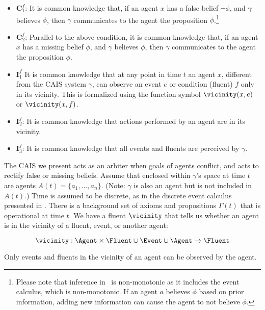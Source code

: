    \begin{itemize}
    \item $\mathbf{C}^f_1$: It is common knowledge that, if an agent
      $x$ has a false belief $\lnot \phi$, and $\gamma$
      believes $\phi$, then $\gamma$ communicates to the agent the
      proposition $\phi$.\footnote{Please note that inference in
        \DCEC\ is non-monotonic as it includes the event calculus,
        which is non-monotonic.  If an agent $a$ believes $\phi$ based
        on prior information, adding new information can cause the
        agent to not believe $\phi$.}

    \item $\mathbf{C}^f_2$: Parallel to the above condition, it is
      common knowledge that, if an agent $x$ has a missing belief
      $\phi$, and $\gamma$ believes $\phi$, then $\gamma$ communicates to
      the agent the proposition $\phi$.

    \item$\mathbf{I}^f_1$ It is common knowledge that at any point in
      time $t$ an agent $x$, different from the CAIS system $\gamma$,
      can observe an event $e$ or condition (fluent) $f$ only in its
      vicinity. This is formalized using the function symbol
      $\vicinity(x, e)$ or $\vicinity(x, f)$.

      \item $\mathbf{I}^f_2$: It is common knowledge that actions
        performed by an agent are in its vicinity.

      \item $\mathbf{I}^f_3$: It is common knowledge that all events
        and fluents are perceived by $\gamma$.
     \end{itemize}

The CAIS we present acts as an arbiter when goals of agents conflict,
and acts to rectify false or missing beliefs.  Assume that enclosed
within $\gamma$'s space at time $t$ are agents
$A(t) = \{a_1, \ldots, a_n\}$.  (Note: $\gamma$ is also an agent but
is not included in $A(t)$.)  Time is assumed to be discrete, as in the
discrete event calculus presented in \cite{mueller_commonsense_2014}.  There is a
background set of axioms and propositions $\Gamma(t)$ that is
operational at time $t$.  We have a fluent $\vicinity$ that tells us
whether an agent is in the vicinity of a fluent, event, or another
agent:
\begin{footnotesize}
$$\vicinity: \Agent \times \Fluent \cup \Event \cup \Agent \rightarrow
\Fluent $$
\end{footnotesize}
 Only events and fluents in the vicinity of an agent can be
observed by the agent.

